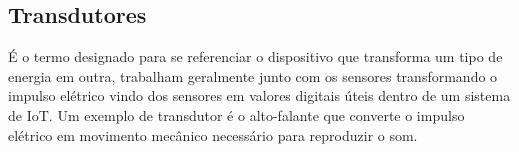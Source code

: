 \subsection{Transdutores}
\label{subsec:transdutores}
É o termo designado para se referenciar o dispositivo que transforma um tipo de energia em outra, trabalham geralmente junto com os sensores transformando o impulso elétrico vindo dos sensores em valores digitais úteis dentro de um sistema de IoT. Um exemplo de transdutor é o alto-falante que converte o impulso elétrico em movimento mecânico necessário para reproduzir o som.~\cite{wendling2010}


